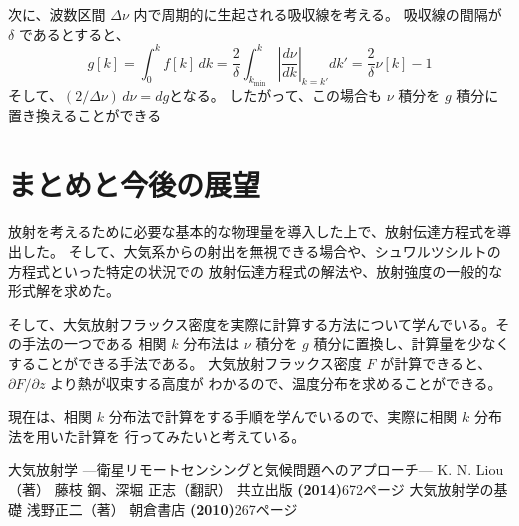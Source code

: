 \documentclass[article,twoside]{dennou777}
\begin{document}
次に、波数区間 $\Delta\nu$ 内で周期的に生起される吸収線を考える。
吸収線の間隔が $\delta$ であるとすると、
\begin{equation}
	g[k]=\int^k_0 f[k]\,dk
	=\frac{2}{\delta}\int^k_{k_{\mathrm{min}}}\left|\frac{d\nu}{dk}\right|_{k=k'}dk'
	=\frac{2}{\delta}\nu[k]-1
\end{equation}
そして、$(2/\Delta\nu)\,d\nu=dg$となる。
したがって、この場合も $\nu$ 積分を $g$ 積分に置き換えることができる

\section{まとめと今後の展望}

放射を考えるために必要な基本的な物理量を導入した上で、放射伝達方程式を導出した。
そして、大気系からの射出を無視できる場合や、シュワルツシルトの方程式といった特定の状況での
放射伝達方程式の解法や、放射強度の一般的な形式解を求めた。

そして、大気放射フラックス密度を実際に計算する方法について学んでいる。その手法の一つである
相関 $k$ 分布法は $\nu$ 積分を $g$ 積分に置換し、計算量を少なくすることができる手法である。
大気放射フラックス密度 $F$ が計算できると、$\partial F/\partial z$ より熱が収束する高度が
わかるので、温度分布を求めることができる。

現在は、相関 $k$ 分布法で計算をする手順を学んでいるので、実際に相関 $k$ 分布法を用いた計算を
行ってみたいと考えている。

\clearpage
\begin{thebibliography}{9}
	 大気放射学 ---衛星リモートセンシングと気候問題へのアプローチ---
		K. N. Liou（著） 藤枝 鋼、深堀 正志（翻訳）
		共立出版 \textbf{(2014)}\quad672ページ
	 大気放射学の基礎 浅野正二（著） 朝倉書店 \textbf{(2010)}\quad267ページ
\end{thebibliography}

\pagebreak
\listoffigures
\listoftables
\end{document}
